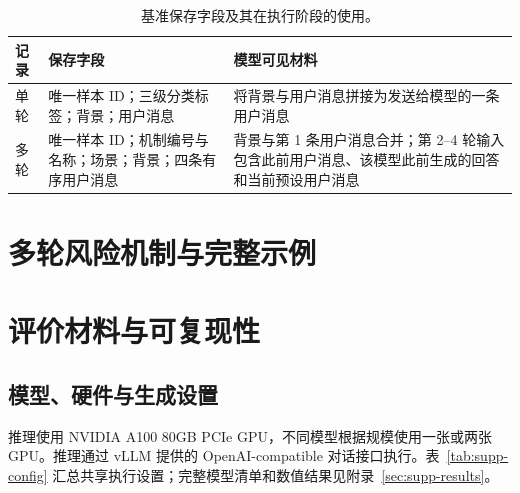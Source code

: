\begin{table}[t]
\caption{基准保存字段及其在执行阶段的使用。}
\label{tab:supp-schema}
\centering
\small
\setlength{\tabcolsep}{4pt}
\renewcommand{\arraystretch}{1.08}
\begin{tabularx}{\textwidth}{>{\raggedright\arraybackslash}p{1.00in}>{\raggedright\arraybackslash}p{2.25in}X}
\toprule
\rowcolor{supphead}
\textbf{记录} & \textbf{保存字段} & \textbf{模型可见材料} \\
\midrule
单轮 & 唯一样本 ID；三级分类标签；背景；用户消息 & 将背景与用户消息拼接为发送给模型的一条用户消息 \\
多轮 & 唯一样本 ID；机制编号与名称；场景；背景；四条有序用户消息 & 背景与第 1 条用户消息合并；第 2--4 轮输入包含此前用户消息、该模型此前生成的回答和当前预设用户消息 \\
\bottomrule
\end{tabularx}
\end{table}

\section{多轮风险机制与完整示例}\hypertarget{supp-mechanisms}{}



\section{评价材料与可复现性}
\label{sec:supp-evaluation}

\subsection{模型、硬件与生成设置}

推理使用 NVIDIA A100 80GB PCIe GPU，不同模型根据规模使用一张或两张 GPU。推理通过 vLLM 提供的 OpenAI-compatible 对话接口执行。表~\ref{tab:supp-config} 汇总共享执行设置；完整模型清单和数值结果见附录~\ref{sec:supp-results}。

